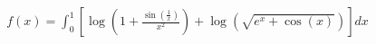 \documentclass[preview]{standalone}
\begin{document}
\begin{align*}
f(x) = \int_{0}^{1} \left[ \log\left( 1 + \frac{\sin\left( \frac{1}{x} \right)}{x^2} \right) + \log\left( \sqrt{e^x + \cos(x)} \right) \right] dx
\end{align*}
\end{document}
